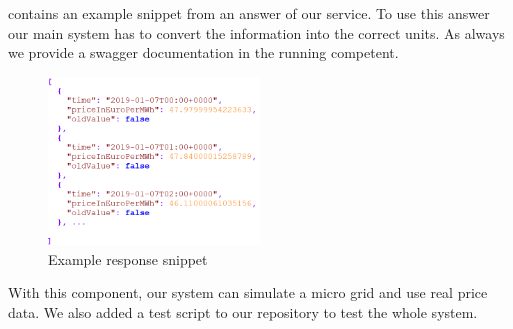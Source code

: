  contains an example snippet from an answer of our service. 
To use this answer our main system has to convert the information into the correct units.
As always we provide a swagger documentation in the running competent.  

\begin{figure}[!h]
	\centering
	\includegraphics[width=0.5\textwidth]{../figures/response.png}
	\caption{Example response snippet}
	\label{fig:responseSnippet}
\end{figure}
 
With this component, our system can simulate a micro grid and use real price data. 
We also added a test script to our repository to test the whole system. 
